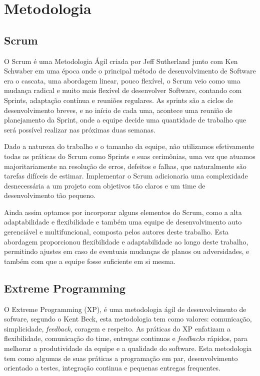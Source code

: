 \chapter[Metodologia]{Metodologia}

\section{Scrum}

O Scrum é uma Metodologia Ágil criada por Jeff Sutherland junto com Ken Schwaber em uma época onde o principal método de desenvolvimento de Software era o cascata, uma abordagem linear, pouco flexível, o Scrum veio como uma mudança radical e muito mais flexível de desenvolver Software, contando com Sprints, adaptação contínua e reuniões regulares.
As sprints são a ciclos de desenvolvimento breves, e no início de cada uma, acontece uma reunião de planejamento da Sprint, onde a equipe decide uma quantidade de trabalho que será possível realizar nas próximas duas semanas.\cite{shuterland2014}

Dado a natureza do trabalho e o tamanho da equipe, não utilizamos efetivamente todas as práticas do Scrum como Sprints e suas cerimônias, uma vez que atuamos majoritariamente na resolução de erros, defeitos e falhas, que naturalmente são tarefas difíceis de estimar. Implementar o Scrum adicionaria uma complexidade desnecessária a um projeto com objetivos tão claros e um time de desenvolvimento tão pequeno.

Ainda assim optamos por incorporar alguns elementos do Scrum, como a alta adaptabilidade e flexibilidade e também uma equipe de desenvolvimento auto gerenciável e multifuncional, composta pelos autores deste trabalho. Esta abordagem proporcionou flexibilidade e adaptabilidade ao longo deste trabalho, permitindo ajustes em caso de eventuais mudanças de planos ou adversidades, e também com que a equipe fosse suficiente em si mesma.

\section{Extreme Programming}
O Extreme Programming (XP), é uma metodologia ágil de desenvolvimento de sofware, segundo o Kent Beck, esta metodologia tem como valores: comunicação, simplicidade, \textit{feedback}, coragem e respeito. As práticas do XP enfatizam a flexibilidade, comunicação do time, entregas continuas e \textit{feedbacks} rápidos, para melhorar a produtividade da equipe e a qualidade do software. Esta metodologia tem como algumas de suas práticas a programação em par, desenvolvimento orientado a testes, integração continua e pequenas entregas frequentes. \cite{kentbeck2014}

